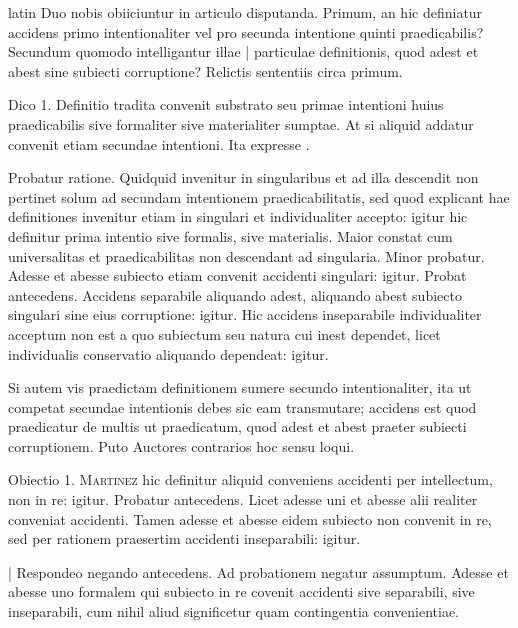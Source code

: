 \begin{otherlanguage*}{latin}
\pstart
  Duo nobis obiiciuntur in articulo disputanda. Primum, an hic definiatur accidens primo intentionaliter vel pro secunda intentione quinti praedicabilis? Secundum quomodo intelligantur illae \textnormal{|} particulae definitionis, quod adest et abest sine subiecti corruptione? Relictis sententiis circa primum. 
\pend

\pstart
  Dico 1. Definitio tradita convenit substrato seu primae intentioni huius praedicabilis sive formaliter sive materialiter sumptae. At si aliquid addatur convenit etiam secundae intentioni. Ita expresse . 
\pend

\pstart
  Probatur ratione. Quidquid invenitur in singularibus et ad illa descendit non pertinet solum ad secundam intentionem praedicabilitatis, sed quod explicant hae definitiones invenitur etiam in singulari et individualiter accepto: igitur hic definitur prima intentio sive formalis, sive materialis. Maior constat cum universalitas et praedicabilitas non descendant ad singularia. Minor probatur. Adesse et abesse subiecto etiam convenit accidenti singulari: igitur. Probat antecedens. Accidens separabile aliquando adest, aliquando abest subiecto singulari sine eius corruptione: igitur. Hic accidens inseparabile individualiter acceptum non est a quo subiectum seu natura cui inest dependet, licet individualis conservatio aliquando dependeat: igitur. 
\pend

\pstart
  Si autem vis praedictam definitionem sumere secundo intentionaliter, ita ut competat secundae intentionis debes sic eam transmutare; accidens est quod praedicatur de multis ut praedicatum, quod adest et abest praeter subiecti corruptionem. Puto Auctores contrarios hoc sensu loqui. 
\pend

\pstart
  Obiectio 1. \textsc{Martinez}  hic definitur aliquid conveniens accidenti per intellectum, non in re: igitur. Probatur antecedens. Licet adesse uni et abesse alii realiter conveniat accidenti. Tamen adesse et abesse eidem subiecto non convenit in re, sed per rationem praesertim accidenti inseparabili: igitur. 
\pend

\pstart
  \textnormal{|}   Respondeo negando antecedens. Ad probationem negatur assumptum. Adesse et abesse uno formalem qui subiecto in re covenit accidenti sive separabili, sive inseparabili, cum nihil aliud significetur quam contingentia convenientiae. 
\pend


\end{otherlanguage*}
